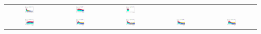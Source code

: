 \documentclass[usenames,dvipsnames]{beamer}
\begin{document}
\begin{frame}
{\begin{tabular}{ccccc}
\includegraphics[width=0.20\textwidth]{graphics/HH_run2/HH_met_fb_MT2.png} &
\includegraphics[width=0.20\textwidth]{graphics/HH_run2/HH_met_fb_nJets.png} &
\includegraphics[width=0.20\textwidth]{graphics/HH_run2/HH_met_fb_bNumber.png} \\
\includegraphics[width=0.20\textwidth]{graphics/HH_run2/HH_met_fb_pt_jet1.png} &
\includegraphics[width=0.20\textwidth]{graphics/HH_run2/HH_met_fb_dRtt.png} &
\includegraphics[width=0.20\textwidth]{graphics/HH_run2/HH_met_fb_dPhit1x.png} &
\includegraphics[width=0.20\textwidth]{graphics/HH_run2/HH_met_fb_dPhit2x.png} &
\includegraphics[width=0.20\textwidth]{graphics/HH_run2/HH_met_fb_dPhitt.png}
\end{tabular}
}

\end{frame}
\end{document}
